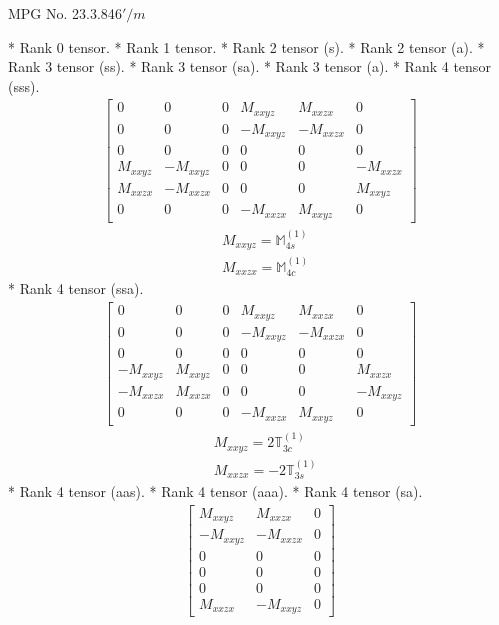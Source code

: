 \documentclass[fleqn,8pt,landscape]{jsarticle}
\begin{document}
\setcounter{MaxMatrixCols}{32}

\renewcommand{\tablename}{Table~}
\renewcommand{\figurename}{Figure~}
\begin{center}
\LARGE
MPG No. 23.3.84\quad$6'/m$
\end{center}
* Rank 0 tensor.
* Rank 1 tensor.
* Rank 2 tensor (s).
* Rank 2 tensor (a).
* Rank 3 tensor (ss).
* Rank 3 tensor (sa).
* Rank 3 tensor (a).
* Rank 4 tensor (sss).
\begin{align*}
\begin{bmatrix} 0 & 0 & 0 & M_{xxyz} & M_{xxzx} & 0 \\ 0 & 0 & 0 & - M_{xxyz} & - M_{xxzx} & 0 \\ 0 & 0 & 0 & 0 & 0 & 0 \\ M_{xxyz} & - M_{xxyz} & 0 & 0 & 0 & - M_{xxzx} \\ M_{xxzx} & - M_{xxzx} & 0 & 0 & 0 & M_{xxyz} \\ 0 & 0 & 0 & - M_{xxzx} & M_{xxyz} & 0 \end{bmatrix}
\end{align*}
\begin{align*}
& M_{xxyz} = \mathbb{M}_{4s}^{(1)} \\
& M_{xxzx} = \mathbb{M}_{4c}^{(1)}
\end{align*}
* Rank 4 tensor (ssa).
\begin{align*}
\begin{bmatrix} 0 & 0 & 0 & M_{xxyz} & M_{xxzx} & 0 \\ 0 & 0 & 0 & - M_{xxyz} & - M_{xxzx} & 0 \\ 0 & 0 & 0 & 0 & 0 & 0 \\ - M_{xxyz} & M_{xxyz} & 0 & 0 & 0 & M_{xxzx} \\ - M_{xxzx} & M_{xxzx} & 0 & 0 & 0 & - M_{xxyz} \\ 0 & 0 & 0 & - M_{xxzx} & M_{xxyz} & 0 \end{bmatrix}
\end{align*}
\begin{align*}
& M_{xxyz} = 2 \mathbb{T}_{3c}^{(1)} \\
& M_{xxzx} = - 2 \mathbb{T}_{3s}^{(1)}
\end{align*}
* Rank 4 tensor (aas).
* Rank 4 tensor (aaa).
* Rank 4 tensor (sa).
\begin{align*}
\begin{bmatrix} M_{xxyz} & M_{xxzx} & 0 \\ - M_{xxyz} & - M_{xxzx} & 0 \\ 0 & 0 & 0 \\ 0 & 0 & 0 \\ 0 & 0 & 0 \\ M_{xxzx} & - M_{xxyz} & 0 \end{bmatrix}
\end{align*}
\end{document}
